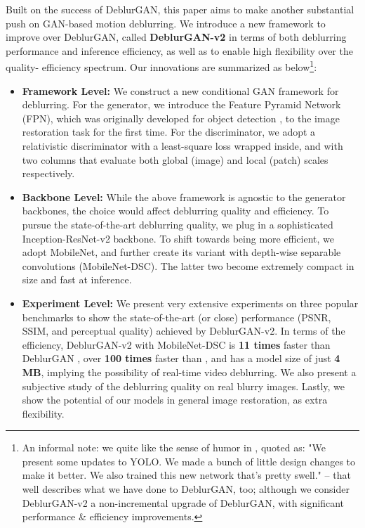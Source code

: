 \documentclass[10pt,twocolumn,letterpaper]{article}
\begin{document}
Built on the success of DeblurGAN, this paper aims to make another substantial push on GAN-based motion deblurring. We introduce a new framework to improve over DeblurGAN, called \textbf{DeblurGAN-v2} in terms of both deblurring performance and inference efficiency, as well as to enable high flexibility over the quality- efficiency spectrum. Our innovations are summarized as below\footnote{An informal note: we quite like the sense of humor in \cite{redmon2018yolov3}, quoted as: "We present some updates to YOLO. We made a bunch of little design changes to make it better. We also trained this new network that's pretty swell." -- that well describes what we have done to DeblurGAN, too; although we consider DeblurGAN-v2 a non-incremental upgrade of DeblurGAN, with significant performance \& efficiency improvements.}:
\begin{itemize}
\vspace{-0.5em}
    \item \textbf{Framework Level:} We construct a new conditional GAN framework for deblurring. For the generator, we introduce the Feature Pyramid Network (FPN), which was originally developed for object detection \cite{lin2017feature}, to the image restoration task for the first time. For the discriminator, we adopt a relativistic discriminator \cite{jolicoeur2018relativistic} with a least-square loss wrapped \cite{LSGAN} inside, and with two columns that evaluate both global (image) and local (patch) scales respectively. 
    \vspace{-0.5em}
    \item \textbf{Backbone Level:} While the above framework is agnostic to the generator backbones, the choice would affect deblurring quality and efficiency. To pursue the state-of-the-art deblurring quality, we plug in a sophisticated Inception-ResNet-v2 backbone. To shift towards being more efficient, we adopt MobileNet, and further create its variant with depth-wise separable convolutions (MobileNet-DSC). The latter two become extremely compact in size and fast at inference.\vspace{-0.5em}
    \item \textbf{Experiment Level:} We present very extensive experiments on three popular benchmarks to show the state-of-the-art (or close) performance (PSNR, SSIM, and perceptual quality) achieved by DeblurGAN-v2. In terms of the efficiency, DeblurGAN-v2 with MobileNet-DSC is \textbf{11 times} faster than DeblurGAN \cite{kupyn2018deblurgan}, over \textbf{100 times} faster than \cite{Nah2016DeepDeblurring,tao2018scale}, and has a model size of just \textbf{4 MB}, implying the possibility of real-time video deblurring. We also present a subjective study of the deblurring quality on real blurry images. Lastly, we show the potential of our models in general image restoration, as extra flexibility.
\vspace{-0.5em}
\end{itemize}
\end{document}
